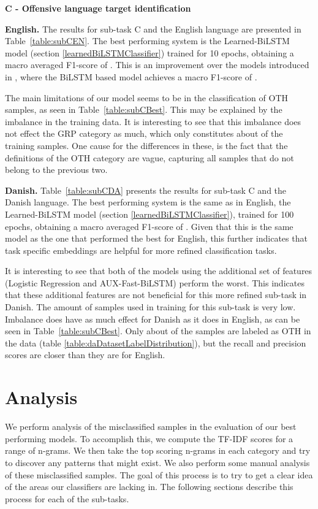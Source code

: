 \documentclass{article}
\begin{document}
\textbf{C - Offensive language target identification}\label{sec:resultsSubC}

\textbf{English.} The results for sub-task C and the English language are presented in Table~\ref{table:subCEN}. The best performing system is the Learned-BiLSTM model (section \ref{learnedBiLSTMClassifier}) trained for 10 epochs, obtaining a macro averaged F1-score of . This is an improvement over the models introduced in \cite{zampieri2019predicting}, where the BiLSTM based model achieves a macro F1-score of .

The main limitations of our model seems to be in the classification of OTH samples, as seen in Table~\ref{table:subCBest}. This may be explained by the imbalance in the training data. It is interesting to see that this imbalance does not effect the GRP category as much, which only constitutes about  of the training samples. One cause for the differences in these, is the fact that the definitions of the OTH category are vague, capturing all samples that do not belong to the previous two. 

\textbf{Danish.} Table~\ref{table:subCDA} presents the results for sub-task C and the Danish language. The best performing system is the same as in English, the Learned-BiLSTM model (section \ref{learnedBiLSTMClassifier}), trained for 100 epochs, obtaining a macro averaged F1-score of . Given that this is the same model as the one that performed the best for English, this further indicates that task specific embeddings are helpful for more refined classification tasks. 

It is interesting to see that both of the models using the additional set of features (Logistic Regression and AUX-Fast-BiLSTM) perform the worst. This indicates that these additional features are not beneficial for this more refined sub-task in Danish. The amount of samples used in training for this sub-task is very low. Imbalance does  have as much effect for Danish as it does in English, as can be seen in Table~\ref{table:subCBest}. Only about  of the samples are labeled as OTH in the data (table \ref{table:daDatasetLabelDistribution}), but  the recall and precision scores are  closer than they are for English.


\section{Analysis}\label{sec:errorAnalysis}
We perform analysis of the misclassified samples in the evaluation of our best performing models. To accomplish this, we compute the TF-IDF scores for a range of n-grams. We then take the top scoring n-grams in each category and try to discover any patterns that might exist. We also perform some manual analysis of these misclassified samples. The goal of this process is to try to get a clear idea of the areas our classifiers are lacking in. The following sections describe this process for each of the sub-tasks. 
\end{document}
